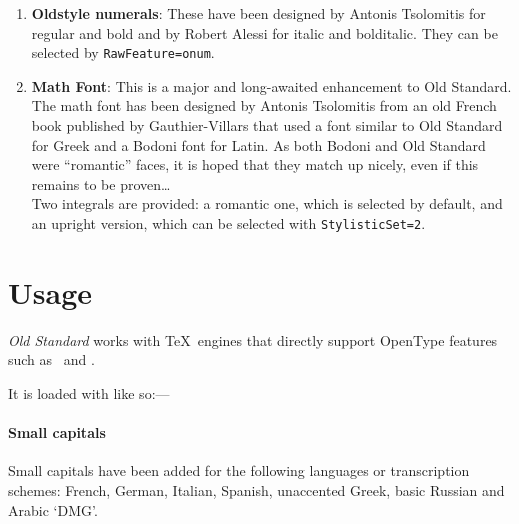 \begin{enumerate}
\begin{enumerate}
  \item \texttt{ss05} and \texttt{ss06}:
    {%
      θαυμασθεὶς ὁ βάρβαρος.}
  \end{enumerate}
\item \textbf{Oldstyle numerals}: These have been designed by Antonis
  Tsolomitis for regular and bold and by Robert Alessi for italic and
  bolditalic. They can be selected by \verb|RawFeature=onum|.
\item \textbf{Math Font}: This is a major and long-awaited enhancement
  to Old Standard. The math font has been designed by Antonis
  Tsolomitis from an old French book published by Gauthier-Villars
  that used a font similar to Old Standard for Greek and a Bodoni font
  for Latin. As both Bodoni and Old Standard were \enquote{romantic}
  faces, it is hoped that they match up nicely, even if this remains
  to be proven\dots\\
  Two integrals are provided: a romantic one, which is selected by
  default, and an upright version, which can be selected with
  \verb|StylisticSet=2|.
\end{enumerate}

\section{Usage}
\label{sec:usage}
\emph{Old Standard} works with \TeX\ engines that directly support
OpenType features such as \XeTeX\ and \LuaTeX.

It is loaded with  like so:---
\begin{code}
  \usepackage{fontspec}
  \setmainfont{Old Standard}
\end{code}

\paragraph{Small capitals}
Small capitals have been added for the following languages or
transcription schemes: French, German, Italian, Spanish, unaccented
Greek, basic Russian and Arabic \enquote*{DMG}.

